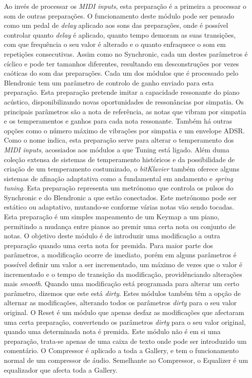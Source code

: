 \documentclass[../main.tex]{subfiles}
\begin{document}
\begin{description}
     Ao invés de processar os \textit{MIDI inputs}, esta preparação é a primeira a processar o som de outras preparações. O funcionamento deste módulo pode ser pensado como um pedal de \textit{delay} aplicado aos sons das preparações, onde é possível controlar quanto \textit{delay} é aplicado, quanto tempo demoram as suas transições, com que frequência o seu valor é alterado e o quanto enfraquece o som em repetições consecutivas. Assim como no Synchronic, cada um destes parâmetros é cíclico e pode ter tamanhos diferentes, resultando em desconstruções por vezes caóticas do som das preparações. Cada um dos módulos que é processado pelo Blendronic tem um parâmetro de controlo de ganho enviado para esta preparação.
     Esta preparação pretende imitar a capacidade ressonante do piano acústico, disponibilizando novas oportunidades de ressonâncias por simpatia. Os principais parâmetros são a nota de referência, as notas que vibram por simpatia e os temperamentos e ganhos para cada nota ressonante. Também há outras opções como o número máximo de vibrações por simpatia e um envelope ADSR.
     Como o nome indica, esta preparação serve para alterar o temperamento dos \textit{MIDI inputs}, acossiados aos módulos a que Tuning está ligado. Além duma coleção extensa de sistemas de temperamento históricos e da possibilidade de criação de um temperamento costumizado, o \textit{bitKlavier} também oferece alguns sistemas de afinação adaptativa como a fundamental em andamento\cite{code2002} e \textit{spring tuning}\cite{sethares2005}.
     Esta preparação representa um metrónomo que controla os pulsos do Synchronic e do Blendronic a que estão conectados. Este metrónomo pode ser estático ou adaptativo, mutando-se conforme várias notas vão sendo tocadas.
     Esta preparação é um simples mapeamento de um Keymap a um piano, permitindo a mudança entre pianos ao premir uma certa nota ou conjunto de notas.
     O objetivo deste módulo é de introduzir uma modificação a outra preparação quando uma certa nota for premida. Para maior parte dos parâmetros, a modificação ocorre de imediato, porém em alguns parâmetros é possível definir um valor a ser incrementado, um máximo de vezes que o valor é incrementado e o tempo de transição da modificação, providênciando alterações mais \textit{smooth}. Quando uma modificação está programada para alterar um certo parâmetro, dizemos que este está \textit{dirty}. Estes módulos também têm a opção de alternar as modificações, alterando todos os parâmetros \textit{dirty} para o seu valor original.
     O Reset é um módulo que apenas desfaz as modificações que afectaram uma certa preparação, convertendo os parâmetros \textit{dirty} para o seu valor original, quando uma determinada nota é premida. 
     Este módulo não é em si uma preparação, trata-se apenas de uma caixa de texto onde pode ser introduzido um comentário.
     O Compressor é aplicado a toda a Gallery, e tem o funcionamento normal de um compressor de áudio.
     Semelhante ao Compressor, o Equalizer é um equalizador que afecta toda a Gallery.
\end{description}
\end{document}
